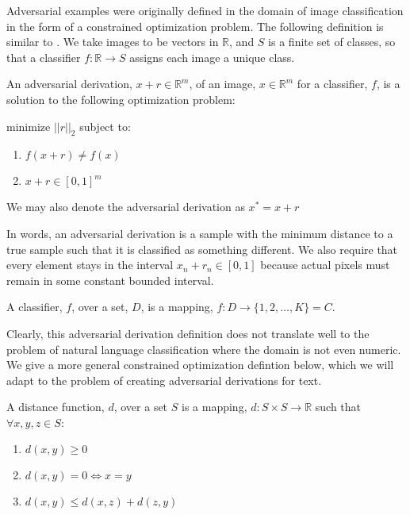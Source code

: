 Adversarial examples were originally defined in the domain of image classification in the form of a constrained optimization problem.  The following definition is similar to \cite{cs14}.  We take images to be vectors in $\mathbb{R}$, and $S$ is a finite set of classes, so that a classifier $f:\mathbb{R}\rightarrow S$ assigns each image a unique class.

\begin{definition}
An adversarial derivation, $x + r \in \mathbb{R}^m$, of an image, $x \in \mathbb{R}^m$ for a classifier, $f$, is a solution to the following optimization problem:
\end{definition}

\noindent
minimize $||r||_2$ subject to:
\begin{enumerate}
\item $f(x + r) \neq f(x)$
\item $x+r \in [0,1]^m$
\end{enumerate}
We may also denote the adversarial derivation as $x^* = x + r$

\noindent
In words, an adversarial derivation is a sample with the minimum distance to a true sample such that it is classified as something different.  We also require that every element stays in the interval $x_n+r_n \in [0,1]$ because actual pixels must remain in some constant bounded interval.

\begin{definition}
A classifier, $f$, over a set, $D$, is a mapping, $f : D\rightarrow \{1,2,\dots,K\} = C$.
\end{definition}

Clearly, this adversarial derivation definition does not translate well to the problem of natural language classification where the domain is not even numeric.  We give a more general  constrained optimization defintion below, which we will adapt to the problem of creating adversarial derivations for text.

\begin{definition}
A distance function, $d$, over a set $S$ is a mapping, $d:S\times S\rightarrow \mathbb{R}$ such that $\forall x,y,z \in S$:
\begin{enumerate}
\itemsep0em
\item $d(x,y) \geq 0$
\item $d(x,y) = 0 \iff x=y$
\item $d(x,y) \leq d(x,z) + d(z,y)$
\end{enumerate}
\end{definition}

